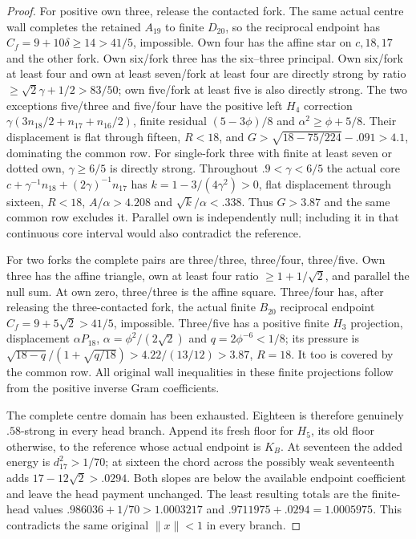 \documentclass[11pt]{article}
\theoremstyle{definition}
\theoremstyle{remark}
\newcommand{\norm}[1]{\lVert #1\rVert}
\begin{document}
\begin{proof}
For positive own three, release the contacted fork. The same
actual centre wall completes the retained $A_{19}$ to finite
$D_{20}$, so the reciprocal endpoint has
$C_f=9+10\delta\ge14>41/5$, impossible.
Own four has the affine star on $c,18,17$ and the other fork.
Own six/fork three has the six--three principal.
Own six/fork at least four and own at least seven/fork at
least four are directly strong by ratio
$\ge\sqrt2\gamma+1/2>83/50$; own five/fork at least five
is also directly strong.
The two exceptions five/three and five/four have the positive
left $H_4$ correction $\gamma(3n_{18}/2+n_{17}+n_{16}/2)$,
finite residual $(5-3\phi)/8$ and
$\alpha^2\ge\phi+5/8$.
Their displacement is flat through fifteen, $R<18$, and
$G>\sqrt{18-75/224}-.091>4.1$, dominating the common row.
For single-fork three with finite at least seven or dotted
own, $\gamma\ge6/5$ is directly strong. Throughout
$.9<\gamma<6/5$ the actual core
$c+\gamma^{-1}n_{18}+(2\gamma)^{-1}n_{17}$ has
$k=1-3/(4\gamma^2)>0$, flat displacement through sixteen,
$R<18$, $A/\alpha>4.208$ and $\sqrt k/\alpha<.338$.
Thus $G>3.87$ and the same common row excludes it.
Parallel own is independently null; including it in that
continuous core interval would also contradict the reference.

For two forks the complete pairs are three/three, three/four,
three/five. Own three has the affine triangle, own at least
four ratio $\ge1+1/\sqrt2$, and parallel the null sum.
At own zero, three/three is the affine square.
Three/four has, after releasing the three-contacted fork, the
actual finite $B_{20}$ reciprocal endpoint
$C_f=9+5\sqrt2>41/5$, impossible.
Three/five has a positive finite $H_3$ projection, displacement
$\alpha P_{18}$, $\alpha=\phi^2/(2\sqrt2)$ and
$q=2\phi^{-6}<1/8$; its pressure is
$\sqrt{18-q}/(1+\sqrt{q/18})>4.22/(13/12)>3.87$, $R=18$.
It too is covered by the common row. All original wall
inequalities in these finite projections follow from the
positive inverse Gram coefficients.

The complete centre domain has been exhausted. Eighteen is
therefore genuinely $.58$-strong in every head branch.
Append its fresh floor for $H_5$, its old floor otherwise,
to the reference whose actual endpoint is $K_B$.
At seventeen the added energy is $d_{17}^2>1/70$;
at sixteen the chord across the possibly weak seventeenth
adds $17-12\sqrt2>.0294$. Both slopes are below the available
endpoint coefficient and leave the head payment unchanged.
The least resulting totals are the finite-head values
$.986036+1/70>1.0003217$ and
$.9711975+.0294=1.0005975$.
This contradicts the same original $\norm x<1$ in every branch.
\end{proof}
\end{document}
